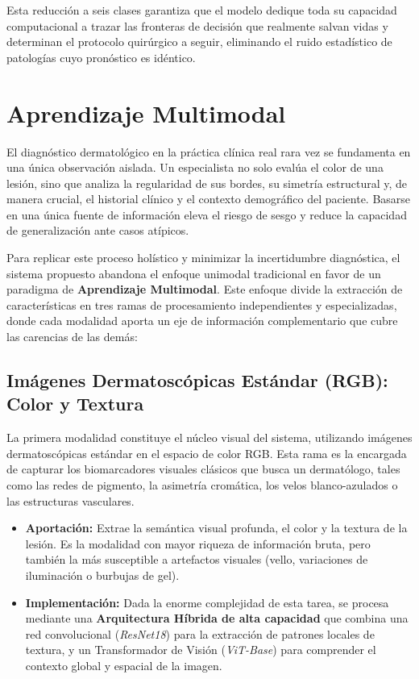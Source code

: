 Esta reducción a seis clases garantiza que el modelo dedique toda su capacidad computacional a trazar las fronteras de decisión que realmente salvan vidas y determinan el protocolo quirúrgico a seguir, eliminando el ruido estadístico de patologías cuyo pronóstico es idéntico.

\section{Aprendizaje Multimodal}

El diagnóstico dermatológico en la práctica clínica real rara vez se fundamenta en una única observación aislada. Un especialista no solo evalúa el color de una lesión, sino que analiza la regularidad de sus bordes, su simetría estructural y, de manera crucial, el historial clínico y el contexto demográfico del paciente. Basarse en una única fuente de información eleva el riesgo de sesgo y reduce la capacidad de generalización ante casos atípicos.

Para replicar este proceso holístico y minimizar la incertidumbre diagnóstica, el sistema propuesto abandona el enfoque unimodal tradicional en favor de un paradigma de \textbf{Aprendizaje Multimodal}. Este enfoque divide la extracción de características en tres ramas de procesamiento independientes y especializadas, donde cada modalidad aporta un eje de información complementario que cubre las carencias de las demás:

\subsection{Imágenes Dermatoscópicas Estándar (RGB): Color y Textura}

La primera modalidad constituye el núcleo visual del sistema, utilizando imágenes dermatoscópicas estándar en el espacio de color RGB. Esta rama es la encargada de capturar los biomarcadores visuales clásicos que busca un dermatólogo, tales como las redes de pigmento, la asimetría cromática, los velos blanco-azulados o las estructuras vasculares.

\begin{itemize}
	\item \textbf{Aportación:} Extrae la semántica visual profunda, el color y la textura de la lesión. Es la modalidad con mayor riqueza de información bruta, pero también la más susceptible a artefactos visuales (vello, variaciones de iluminación o burbujas de gel).
	
	\item \textbf{Implementación:} Dada la enorme complejidad de esta tarea, se procesa mediante una \textbf{Arquitectura Híbrida de alta capacidad} que combina una red convolucional (\textit{ResNet18}) para la extracción de patrones locales de textura, y un Transformador de Visión (\textit{ViT-Base}) para comprender el contexto global y espacial de la imagen.
\end{itemize}


